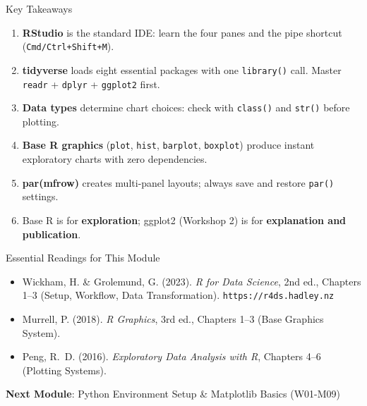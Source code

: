 \documentclass[10pt]{beamer}
\begin{document}
\begin{frame}{Key Takeaways}
  \begin{enumerate}
    \item \textbf{RStudio} is the standard IDE: learn the four panes and
          the pipe shortcut (\texttt{Cmd/Ctrl+Shift+M}).
    \item \textbf{tidyverse} loads eight essential packages with one
          \texttt{library()} call. Master \texttt{readr} + \texttt{dplyr}
          + \texttt{ggplot2} first.
    \item \textbf{Data types} determine chart choices: check with
          \texttt{class()} and \texttt{str()} before plotting.
    \item \textbf{Base R graphics} (\texttt{plot}, \texttt{hist},
          \texttt{barplot}, \texttt{boxplot}) produce instant exploratory
          charts with zero dependencies.
    \item \textbf{par(mfrow)} creates multi-panel layouts; always save
          and restore \texttt{par()} settings.
    \item Base R is for \textbf{exploration}; ggplot2 (Workshop 2) is for
          \textbf{explanation and publication}.
  \end{enumerate}
\end{frame}

\begin{frame}{Essential Readings for This Module}
  \begin{itemize}
    \item Wickham, H. \& Grolemund, G. (2023). \emph{R for Data Science},
          2nd ed., Chapters 1--3 (Setup, Workflow, Data Transformation).
          \texttt{https://r4ds.hadley.nz}
    \item Murrell, P. (2018). \emph{R Graphics}, 3rd ed., Chapters 1--3
          (Base Graphics System).
    \item Peng, R.~D. (2016). \emph{Exploratory Data Analysis with R},
          Chapters 4--6 (Plotting Systems).
  \end{itemize}

  \vspace{6pt}
  \textbf{Next Module}: Python Environment Setup \& Matplotlib Basics (W01-M09)
\end{frame}
\end{document}
